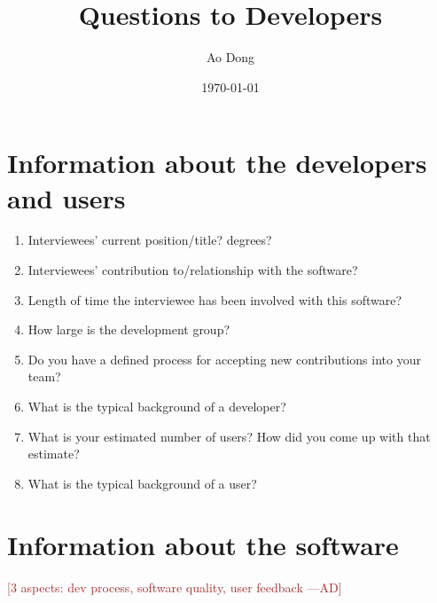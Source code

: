 \documentclass[12pt]{article}
\title{Questions to Developers}
\author{Ao Dong}
\date{\today}
\newcommand{\authornote}[3]{\textcolor{#1}{[#3 ---#2]}}
\newcommand{\authornote}[3]{}
\newcommand{\ad}[1]{\authornote{brown}{AD}{#1}} %
\begin{document}
\maketitle

\section{Information about the developers and users}\citep{Jegatheesan2016}
\begin{enumerate}
\item Interviewees' current position/title? degrees?
\item Interviewees' contribution to/relationship with the software?
\item Length of time the interviewee has been involved with this software?
\item How large is the development group?
\item Do you have a defined process for accepting new contributions into your team?
\item What is the typical background of a developer?
\item What is your estimated number of users? How did you come up with that estimate?
\item What is the typical background of a user?
\end{enumerate}

\section{Information about the software}

\noindent\ad{3 aspects: dev process, software quality, user feedback}
\end{document}
